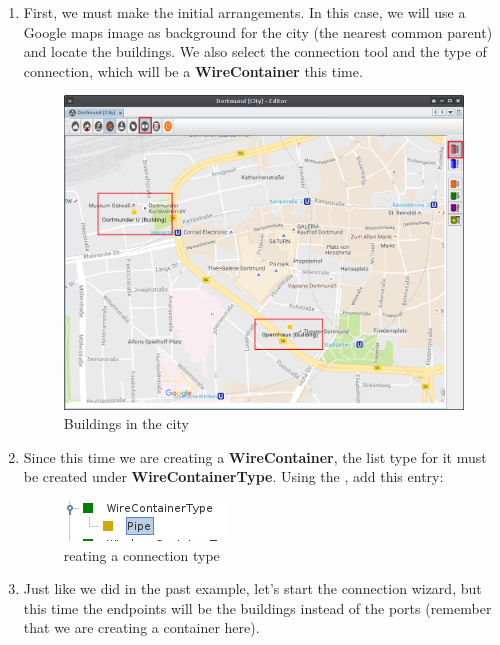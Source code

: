 \documentclass[a4paper]{article}
\begin{document}
			\begin{enumerate}
					\item First, we must make the initial arrangements. In this case, we will use a Google maps image as background for the city (the nearest common parent) and locate the buildings. We also select the connection tool and the type of connection, which will be a \textbf{WireContainer} this time.  
					\begin{figure}[h!]
						\centering
						\includegraphics[width=\linewidth]{img/l1_example_2_initial_view.png}
						\caption{Buildings in the city}
						\label{fig:l1_example_2_initial_view}
					\end{figure}
					\newpage
					\item Since this time we are creating a \textbf{WireContainer}, the list type for it must be created under \textbf{WireContainerType}. Using the , add this entry:
					\begin{figure}[h!]
						\centering
						\includegraphics[width=0.2\linewidth]{img/l1_example_1_wire_container_type.png}
						\caption{reating a connection type}
						\label{fig:l1_example_1_wire_container_type}
					\end{figure}
					\item Just like we did in the past example, let's start the connection wizard, but this time the endpoints will be the buildings instead of the ports (remember that we are creating a container here).

\end{enumerate}
\end{document}
